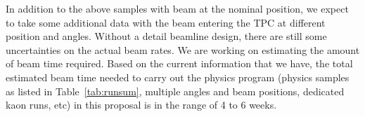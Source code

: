 In addition to the above samples with beam at the nominal position, we expect to take some additional data with the beam entering the TPC at different position and angles. Without a detail beamline design, there are still some uncertainties on the actual beam rates. We are working on estimating the amount of beam time required. Based on the current information that we have, the total estimated beam time needed to carry out the physics program (physics samples as listed in Table~\ref{tab:runsum}, multiple angles and beam positions, dedicated kaon runs, etc) in this proposal is in the range of 4 to 6 weeks.
 
